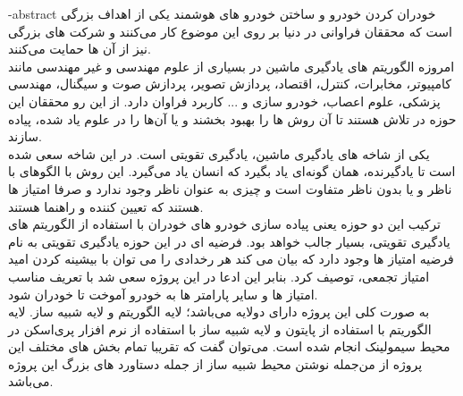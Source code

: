 
\fa-abstract{
خودران کردن خودرو و ساختن خودرو های هوشمند یکی از اهداف بزرگی است که محققان فراوانی در دنیا بر روی این موضوع کار می‌کنند و شرکت های بزرگی نیز از آن ها حمایت می‌کنند. 
\\
امروزه الگوریتم های یادگیری ماشین در بسیاری از علوم مهندسی و غیر مهندسی مانند کامپیوتر، مخابرات، کنترل، اقتصاد، پردازش تصویر، پردازش صوت و سیگنال، مهندسی پزشکی، علوم اعصاب، خودرو سازی و ... کاربرد فراوان دارد. از این رو محققان این حوزه در تلاش هستند تا آن روش ها را بهبود بخشند و یا آن‌ها را در علوم یاد شده، پیاده سازند. 
\\
یکی از شاخه های یادگیری ماشین، یادگیری تقویتی است. 
در این شاخه سعی شده است تا یادگیرنده، همان گونه‌ای یاد بگیرد که انسان یاد می‌گیرد. این روش با الگوهای با ناظر و یا بدون ناظر متفاوت است و چیزی به عنوان ناظر وجود ندارد و صرفا امتیاز ها هستند که تعیین کننده و راهنما هستند. 
\\
ترکیب این دو حوزه یعنی پیاده سازی خودرو های خودران با استفاده از الگوریتم های یادگیری تقویتی، بسیار جالب خواهد بود.  فرضیه ای در این حوزه یادگیری تقویتی به نام فرضیه امتیاز ها وجود دارد که بیان می کند هر رخدادی را می توان با بیشینه کردن امید امتیاز تجمعی، توصیف کرد. بنابر این ادعا در این پروژه سعی شد با تعریف مناسب امتیاز ها و سایر پارامتر ها به 
خودرو آموخت تا خودران شود. 
\\
به صورت کلی این پروژه دارای دولایه می‌باشد؛ لایه الگوریتم و لایه شبیه ساز. لایه الگوریتم با استفاده از پایتون و لایه شبیه ساز با استفاده از نرم افزار پری‌اسکن در محیط سیمولینک انجام شده است. می‌توان گفت که تقریبا تمام بخش های مختلف این پروژه از من‌جمله نوشتن محیط شبیه ساز از جمله دستاورد های بزرگ این پروژه می‌باشد. 
%
}




